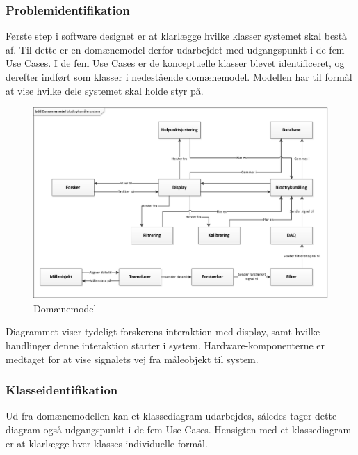\subsubsection{Problemidentifikation}
Første step i software designet er at klarlægge hvilke klasser systemet skal bestå af. Til dette er en domænemodel derfor udarbejdet med udgangspunkt i de fem Use Cases. I de fem Use Cases er de konceptuelle klasser blevet identificeret, og derefter indført som klasser i nedestående domænemodel. Modellen har til formål at vise hvilke dele systemet skal holde styr på. 

\begin{figure}[H]
	\centering
	\includegraphics[width=1.0\textwidth]{Figurer/DomaneModel}
	\caption{Domænemodel}
\end{figure}

Diagrammet viser tydeligt forskerens interaktion med display, samt hvilke handlinger denne interaktion starter i system. Hardware-komponenterne er medtaget for at vise signalets vej fra måleobjekt til system. 

\subsubsection{Klasseidentifikation}
Ud fra domænemodellen kan et klassediagram udarbejdes, således tager dette diagram også udgangspunkt i de fem Use Cases. Hensigten med et klassediagram er at klarlægge hver klasses individuelle formål. 

